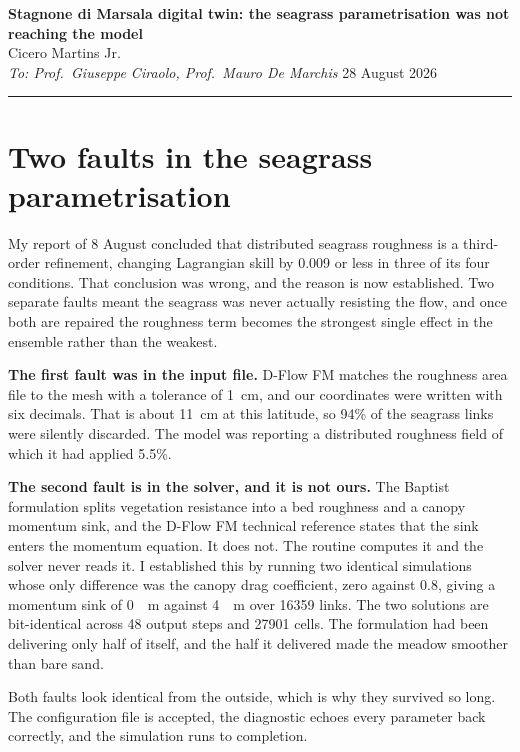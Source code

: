 \documentclass[11pt]{article}
\begin{document}
\thispagestyle{fancy}

\begin{center}
{\large\bfseries Stagnone di Marsala digital twin: the seagrass parametrisation
was not reaching the model}\\[0.3em]
Cicero Martins Jr.\\
\textit{To: Prof.\ Giuseppe Ciraolo, Prof.\ Mauro De Marchis} \hfill 28 August 2026
\end{center}

\vspace{0.2em}
\hrule
\vspace{0.6em}

\section{Two faults in the seagrass parametrisation}

My report of 8 August concluded that distributed seagrass roughness is a
third-order refinement, changing Lagrangian skill by 0.009 or less in three of
its four conditions. That conclusion was wrong, and the reason is now
established. Two separate faults meant the seagrass was never actually resisting
the flow, and once both are repaired the roughness term becomes the strongest
single effect in the ensemble rather than the weakest.

\textbf{The first fault was in the input file.} D-Flow FM matches the roughness
area file to the mesh with a tolerance of 1~cm, and our coordinates were written
with six decimals. That is about 11~cm at this latitude, so 94\% of the seagrass
links were silently discarded. The model was reporting a distributed roughness
field of which it had applied 5.5\%.

\textbf{The second fault is in the solver, and it is not ours.} The Baptist
formulation splits vegetation resistance into a bed roughness and a canopy
momentum sink, and the D-Flow FM technical reference states that the sink enters
the momentum equation. It does not. The routine computes it and the solver never
reads it. I established this by running two identical simulations whose only
difference was the canopy drag coefficient, zero against 0.8, giving a momentum
sink of \SI{0}{\per\metre} against \SI{4}{\per\metre} over 16359 links. The two
solutions are bit-identical across 48 output steps and 27901 cells. The
formulation had been delivering only half of itself, and the half it delivered
made the meadow smoother than bare sand.

Both faults look identical from the outside, which is why they survived so long.
The configuration file is accepted, the diagnostic echoes every parameter back
correctly, and the simulation runs to completion.
\end{document}
